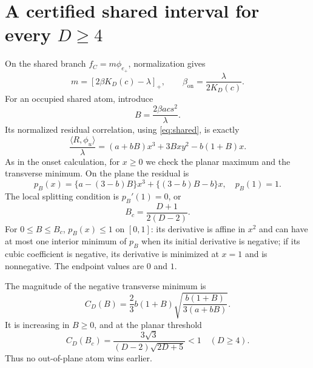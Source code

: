 \documentclass[11pt]{article}
\newcommand{\ip}[2]{\langle #1,#2\rangle}
\newcommand{\on}{\mathrm{on}}
\theoremstyle{remark}
\begin{document}
\section{A certified shared interval for every $D\geq4$}

On the shared branch $f_C=m\phi_{e_+}$, normalization gives
\begin{equation}\label{eq:shared}
 m=[2\beta K_D(c)-\lambda]_+,
 \qquad \beta_\on=\frac\lambda{2K_D(c)}.
\end{equation}
For an occupied shared atom, introduce
\begin{equation}\label{eq:B}
 B=\frac{2\beta a c s^2}{\lambda}.
\end{equation}
Its normalized residual correlation, using \eqref{eq:shared}, is exactly
\begin{equation}\label{eq:residual}
 \frac{\ip R{\phi_u}}\lambda
  =(a+bB)x^3+3Bxy^2-b(1+B)x.
\end{equation}
As in the onset calculation, for $x\geq0$ we check the planar maximum
and the transverse minimum. On the plane the residual is
\begin{equation}\label{eq:resplane}
 p_B(x)=\{a-(3-b)B\}x^3+\{(3-b)B-b\}x,\quad p_B(1)=1.
\end{equation}
The local splitting condition is $p_B'(1)=0$, or
\begin{equation}\label{eq:Bcrit}
 B_c=\frac{D+1}{2(D-2)}.
\end{equation}
For $0\leq B\leq B_c$, $p_B(x)\leq1$ on $[0,1]$:
its derivative is affine in $x^2$ and can have at most one interior
minimum of $p_B$ when its initial derivative is negative; if its cubic
coefficient is negative, its derivative is minimized at $x=1$ and is
nonnegative. The endpoint values are $0$ and $1$.

The magnitude of the negative transverse minimum is
\begin{equation}\label{eq:negative}
 C_D(B)=\frac23 b(1+B)
    \sqrt{\frac{b(1+B)}{3(a+bB)}}.
\end{equation}
It is increasing in $B\geq0$, and at the planar threshold
\begin{equation}\label{eq:Ccrit}
 C_D(B_c)=\frac{3\sqrt3}{(D-2)\sqrt{2D+5}}<1
 \quad(D\geq4).
\end{equation}
Thus no out-of-plane atom wins earlier.
\end{document}
